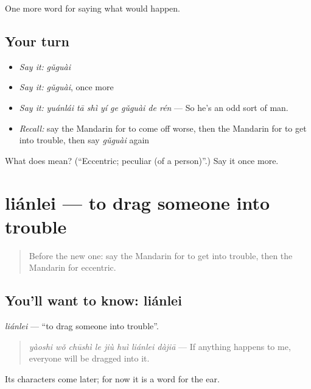 \begin{grammarlens}[title={What you've built}]
One more word for saying what would happen.
\end{grammarlens}

\subsection*{Your turn}
\begin{itemize}
\raggedright
  \item \emph{Say it:} \emph{gǔguài}
  \item \emph{Say it:} \emph{gǔguài}, once more
  \item \emph{Say it:} \emph{yuánlái tā shì yí ge gǔguài de rén} — So he's an odd sort of man.
  \item \emph{Recall:} say the Mandarin for to come off worse, then the Mandarin for to get into trouble, then say \emph{gǔguài} again
\end{itemize}

\begin{tcolorbox}[breakable,colback=teal!4,colframe=teal!35!black,title={Before you move on}]
What does  mean? (\textquotedblleft{}Eccentric; peculiar (of a person)\textquotedblright{}.) Say it once more.
\end{tcolorbox}
\section[liánlei]{liánlei — to drag someone into trouble}

\label{lesson:ZH-C540-lianlei}



\begin{quote}
Before the new one: say the Mandarin for to get into trouble, then the Mandarin for eccentric.
\end{quote}

\subsection*{You'll want to know: liánlei}
\emph{liánlei} — \textquotedblleft{}to drag someone into trouble\textquotedblright{}.

\begin{quote}
\emph{yàoshi wǒ chūshì le jiù huì liánlei dàjiā} — If anything happens to me, everyone will be dragged into it.
\end{quote}

Its characters come later; for now it is a word for the ear.

